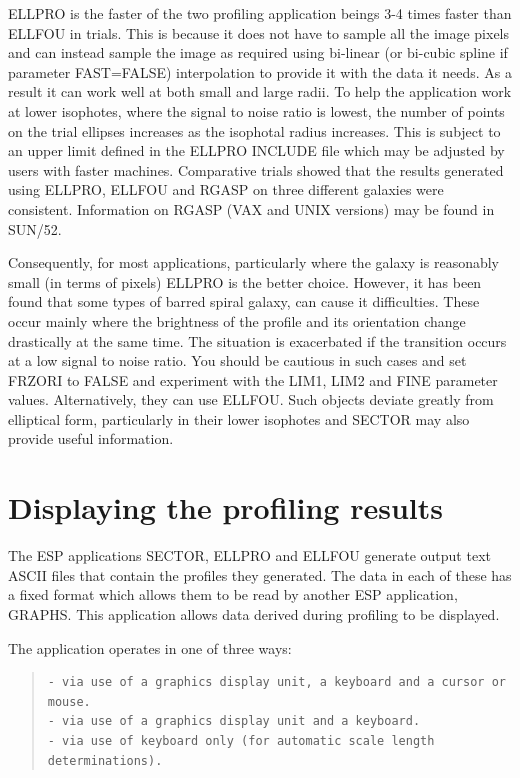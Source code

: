 \documentclass[twoside,11pt]{article}
\newcommand{\xref}[3]{#1}
\newenvironment{myquote}{\begin{quote}\begin{small}}{\end{small}\end{quote}}
\begin{document}
ELLPRO is the faster of the two profiling application beings 3-4 times 
faster than ELLFOU in trials. This is because it does not have to sample 
all the image pixels and can instead sample the image as required 
using bi-linear (or bi-cubic spline if parameter FAST=FALSE) 
interpolation to provide it with the data it needs. As a result it can work 
well at both small and large radii. To help the application work at lower 
isophotes, where the signal to noise ratio is lowest, the number of  
points on the trial ellipses increases as the isophotal
radius increases. This is subject to an upper limit defined in the ELLPRO 
INCLUDE file which may be adjusted by users with faster machines. 
Comparative trials showed that the results generated using ELLPRO, ELLFOU 
and RGASP on three different galaxies were consistent. Information on
RGASP (VAX and UNIX versions) may be found in \xref{SUN/52}{sun52}{}.

Consequently, for most applications, particularly where the galaxy is 
reasonably small (in terms of pixels) ELLPRO is the better choice. 
However, it has been found that some types of barred spiral galaxy, 
can cause it difficulties. These occur mainly where the brightness of
the profile and its orientation change drastically at the same time. 
The situation is exacerbated if the transition occurs at a low signal to 
noise ratio. You should be cautious in such cases and set FRZORI to FALSE 
and experiment with the LIM1, LIM2 and FINE parameter values. Alternatively,
they can use ELLFOU. Such objects deviate greatly from elliptical form, 
particularly in their lower isophotes and SECTOR may also provide useful 
information.


\section{Displaying the profiling results}
\label{sec:displaying}

The ESP applications SECTOR, ELLPRO and ELLFOU generate output text
ASCII files that contain the profiles they generated. The data in each of these
has a fixed format which allows them to be read by another ESP application,
GRAPHS. This application allows data derived during profiling to be displayed.

The application operates in one of three ways:

\begin{myquote}
\begin{verbatim}
- via use of a graphics display unit, a keyboard and a cursor or mouse.
- via use of a graphics display unit and a keyboard.
- via use of keyboard only (for automatic scale length determinations).
\end{verbatim}
\end{myquote}
\end{document}
